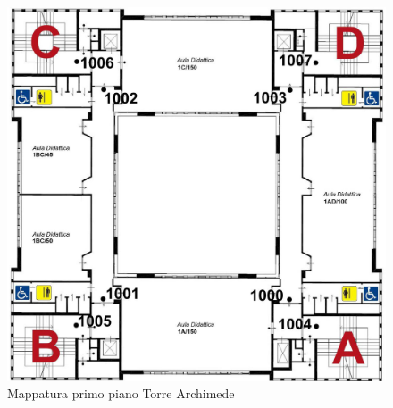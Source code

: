 \documentclass[../SperimentazioniPratiche.tex]{subfiles}
\begin{document}
			\begin{figure}[p]
				\includegraphics[width=\textwidth]{img/PrimoPiano}
				\caption{Mappatura primo piano Torre Archimede}
				\label{fig:PrimoPiano}
			\end{figure}
			
	
\end{document}
